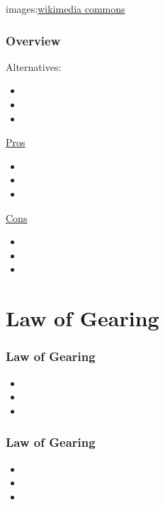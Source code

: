 \documentclass[fleqn]{beamer} %
\newcommand{\sectiontitleI}{Overview} %
\newcommand{\sectiontitleII}{Law of Gearing}
\begin{document}
\begin{frame}[label=sectionI]
\begin{tabular}{|c|c|c|}
		\end{tabular}

		{\tiny images:\href{https://commons.wikimedia.org/w/index.php?search=gear&title=Special:MediaSearch&go=Go&type=image}{wikimedia commons} }

	\end{frame}

	\begin{frame} \small
		\frametitle{\sectiontitleI}

		Alternatives:
		\begin{itemize}
				\item 
				\item
				\item
        \end{itemize}


        \begin{multicols}{2}
		\underline{Pros}
		\begin{itemize}
		\item
		\item
		\item
		\end{itemize}
		\underline{Cons}
		\begin{itemize}
		\item 
		\item
		\item
		\end{itemize}
		\end{multicols}

	\end{frame}

	
\section{\sectiontitleII}	

	\begin{frame}[label=sectionI] \small
		\frametitle{\sectiontitleII}

		   	\begin{itemize}
					\item 
					\item
					\item
	        \end{itemize}

		\end{frame}

	\begin{frame} \small
		\frametitle{\sectiontitleII}
		
		   	\begin{itemize}
					\item 
					\item
					\item
	        \end{itemize}
            
  	\end{frame}
		
\end{document}

